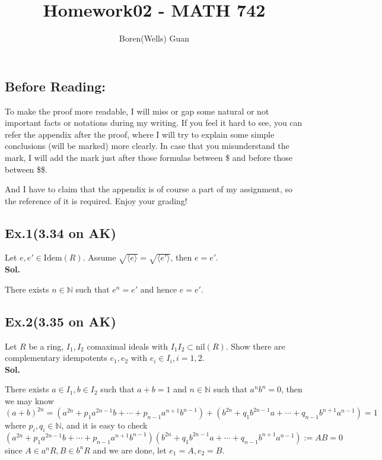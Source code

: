 \documentclass[lang=en,11pt,a4paper,citestyle =authoryear]{elegantpaper}
\title{Homework02 - MATH 742}
\author{Boren(Wells) Guan}
\begin{document}
\maketitle

\subsection*{Before Reading:}\par
To make the proof more readable, I will miss or gap some natural or not important facts or notations during my writing. If you feel it hard to see, you can refer the appendix after the proof, where I will try to explain some simple conclusions (will be marked) more clearly. In case that you misunderstand the mark, I will add the mark just after those formulas between \$ and before those between \$\$.\par
And I have to claim that the appendix is of course a part of my assignment, so the reference of it is required. Enjoy your grading!

\subsection*{Ex.1(3.34 on AK)} 
Let $e,e'\in\text{Idem}(R)$. Assume $\sqrt{\langle e \rangle} = \sqrt{\langle e'\rangle}$, then $e=  e'$.
\vspace{0.5em}\\
\textbf{Sol.} \par
There exists $n\in\mathbb{N}$ such that $e^n = e'$ and hence $e= e'$.
\par 
\vspace{0.5em}

\subsection*{Ex.2(3.35 on AK)} 
Let $R$ be a ring, $I_1,I_2$ comaximal ideals with $I_1I_2\subset \text{nil}(R)$. Show there are complementary idempotents $e_1,e_2$ with $e_i\in I_i, i = 1, 2$.
\vspace{0.5em}\\
\textbf{Sol.} \par
There exists $a\in I_1,b\in I_2$ such that $a+b = 1$ and $n\in \mathbb{N}$ such that $a^nb^n =0$, then we may know
\[
(a+b)^{2n} = (a^{2n}+p_1a^{2n-1}b+\cdots+p_{n-1}a^{n+1}b^{n-1})+(b^{2n}+q_1b^{2n-1}a+\cdots+q_{n-1}b^{n+1}a^{n-1}) = 1
\]
where $p_i,q_i\in\mathbb{N}$, and it is easy to check
\[
(a^{2n}+p_1a^{2n-1}b+\cdots+p_{n-1}a^{n+1}b^{n-1})(b^{2n}+q_1b^{2n-1}a+\cdots+q_{n-1}b^{n+1}a^{n-1}) := AB =0
\]
since $A \in a^nR,B\in b^nR$ and we are done, let $e_1 = A,e_2 = B$.
\par 
\vspace{0.5em}
\end{document}

